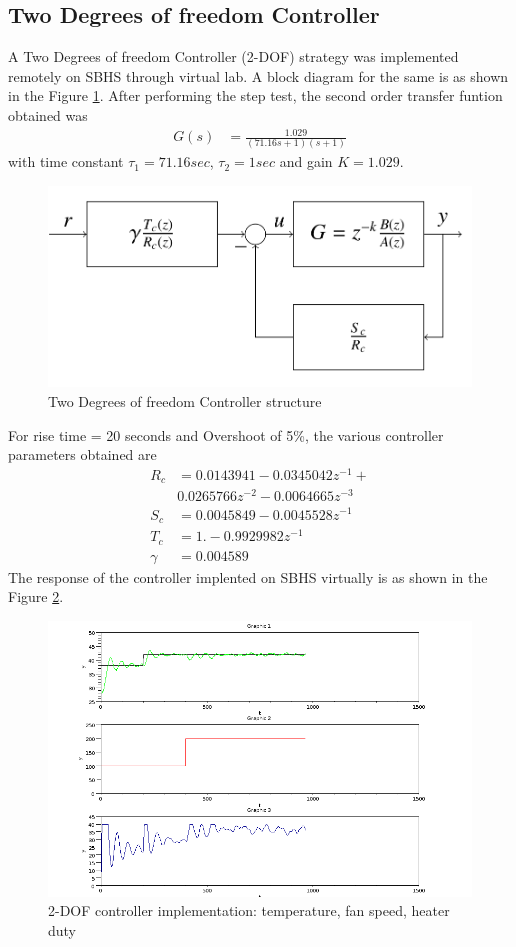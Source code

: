 \subsection{Two Degrees of freedom Controller}
\label{2dof}
A Two Degrees of freedom Controller (2-DOF) strategy \cite{kmm07} was
implemented remotely on SBHS through virtual lab. A block diagram for
the same is as shown in the Figure \ref{2doffig}. After performing the
step test, the second order transfer funtion obtained was  
\begin{align*}
G(s)&=\frac {1.029}{(71.16s+1)(s+1)}
\end{align*}
with time constant $\tau_1 = 71.16 sec$, $\tau_2 = 1 sec$  and gain $K=1.029$.
%
\begin{figure}
\centering
\includegraphics[width=\linewidth]{figures/2dof.png}
\caption{Two Degrees of freedom Controller structure}
\label{2doffig}
\end{figure}
%
For rise time = 20 seconds and Overshoot of 5\%, the various
controller parameters obtained are
\begin{align*}
R_c &=  0.0143941 -  0.0345042z^{-1}  + \\&0.0265766z^{-2} - 0.0064665z^{-3}  \\
S_c &=  0.0045849  - 0.0045528z^{-1}\\
T_c &= 1.  - 0.9929982z^{-1}\\
\gamma &= 0.004589
\end{align*}
The response of the controller implented on SBHS virtually is as shown
in the Figure \ref{2dofresp}.


\begin{figure}
\hspace{-0.2in}
\includegraphics[width=1.2\linewidth]
{figures/twodof_disturbance_intranet.png}
\caption{2-DOF controller implementation: temperature, fan speed,
  heater duty}
\label{2dofresp}
\end{figure}

